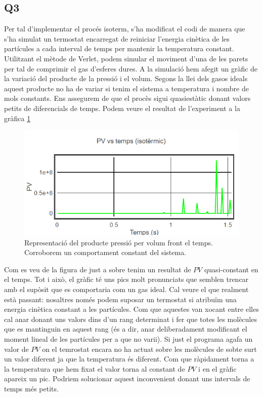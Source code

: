 \documentclass{article}
\begin{document}
	\subsection*{Q3}
	Per tal d'implementar el procés isoterm, s'ha modificat el codi de manera que s'ha simulat un termostat encarregat de reiniciar l'energia cinètica de les partícules a cada interval de temps per mantenir la temperatura constant. Utilitzant el mètode de Verlet, podem simular el moviment d'una de les parets per tal de comprimir el gas d'esferes dures. A la simulació hem afegit un gràfic de la variació del producte de la pressió i el volum. Segons la llei dels gasos ideals aquest producte no ha de variar si tenim el sistema a temperatura i nombre de mols constants. Ens assegurem de que el procès sigui quasiestàtic donant valors petits de diferencials de temps. Podem veure el resultat de l'experiment a la gràfica \ref{cacafuti}
	
	\begin{figure}[h!]
		\centering
		\includegraphics[width=0.7\linewidth]{Q3.png}
		\caption{Representació del producte pressió per volum front el temps. Corroborem un comportament constant del sistema.}
		\label{cacafuti}
	\end{figure}
	
	Com es veu de la figura de just a sobre tenim un resultat de $PV$ quasi-constant en el temps. Tot i això, el gràfic té uns pics molt pronunciats que semblen trencar amb el supòsit que es comportaria com un gas ideal. Cal veure el que realment està passant: nosaltres només podem suposar un termostat si atribuïm una energia cinètica constant a les partícules. Com que aquestes van xocant entre elles cal anar donant uns valors dins d'un rang determinat i fer que totes les molècules que es mantinguin en aquest rang (és a dir, anar deliberadament modificant el moment lineal de les partícules per a que no varii). Si just el programa agafa un valor de $PV$ on el temrostat encara no ha actuat sobre les molècules de sobte surt un valor diferent ja que la temperatura és diferent. Com que ràpidament torna a la temperatura que hem fixat el valor torna al constant de $PV$ i en el gràfic apareix un pic. Podriem solucionar aquest inconvenient donant uns intervals de temps més petits.
	
\end{document}
